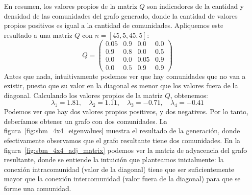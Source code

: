 \documentclass{article}
\begin{document}
En resumen, los valores propios de la matriz $Q$ son indicadores de la cantidad y densidad de las comunidades del grafo generado, donde la cantidad de valores
propios positivos es igual a la cantidad de comunidades. Apliquemos este resultado a una matriz $Q$ con $n=[45, 5, 45, 5]$:
\begin{equation}
    \label{eq:sbm_4x4_matrix}
    Q = \begin{pmatrix}
        0.05 & 0.9 & 0.0 & 0.0 \\
        0.9 & 0.8 & 0.0 & 0.5 \\
        0.0 & 0.0 & 0.05 & 0.9 \\
        0.0 & 0.5 & 0.9 & 0.9
    \end{pmatrix}
\end{equation}
Antes que nada, intuitivamente podemos ver que hay comunidades que no van a existir, puesto que su valor en la diagonal es menor que los valores
fuera de la diagonal. Calculando los valores propios de la matriz $Q$, obtenemos:
\begin{equation}
    \label{eq:sbm_4x4_eigenvalues}
    \lambda_1 = 1.81, \quad\lambda_2 = 1.11, \quad\lambda_3 = -0.71, \quad\lambda_4 = -0.41
\end{equation}
Podemos ver que hay dos valores propios positivos, y dos negativos. Por lo tanto, deberíamos obtener un grafo con dos comunidades. 
La figura~\ref{fig:sbm_4x4_eigenvalues} muestra el resultado de la generación, donde efectivamente observamos que el grafo resultante
tiene dos comunidades. En la figura~\ref{fig:sbm_4x4_adj_matrix} podemos ver la matriz de adyacencia del grafo resultante, donde se entiende
la intuición que planteamos inicialmente: la conexión intracomunidad (valor de la diagonal) tiene que ser suficientemente mayor que la conexión intercomunidad (valor fuera de la diagonal) para que se forme una comunidad.
\end{document}
